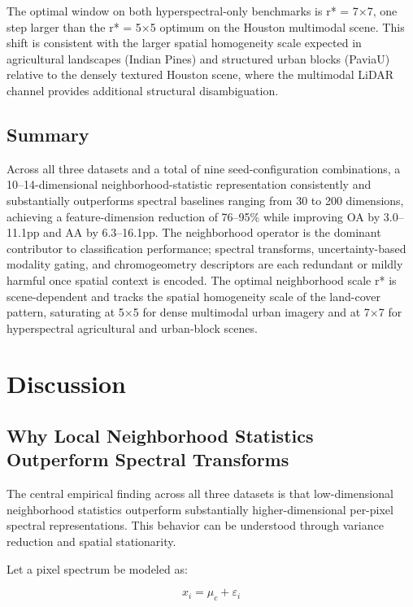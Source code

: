 \documentclass[
  journal]{IEEEtran}
\begin{document}
The optimal window on both hyperspectral-only benchmarks is r* = 7\(\times\)7,
one step larger than the r* = 5\(\times\)5 optimum on the Houston multimodal
scene. This shift is consistent with the larger spatial homogeneity
scale expected in agricultural landscapes (Indian Pines) and structured
urban blocks (PaviaU) relative to the densely textured Houston scene,
where the multimodal LiDAR channel provides additional structural
disambiguation.

\subsection{Summary}\label{summary}

Across all three datasets and a total of nine seed-configuration
combinations, a 10--14-dimensional neighborhood-statistic representation
consistently and substantially outperforms spectral baselines ranging
from 30 to 200 dimensions, achieving a feature-dimension reduction of
76--95\% while improving OA by 3.0--11.1pp and AA by 6.3--16.1pp. The
neighborhood operator is the dominant contributor to classification
performance; spectral transforms, uncertainty-based modality gating, and
chromogeometry descriptors are each redundant or mildly harmful once
spatial context is encoded. The optimal neighborhood scale r* is
scene-dependent and tracks the spatial homogeneity scale of the
land-cover pattern, saturating at 5\(\times\)5 for dense multimodal urban imagery
and at 7\(\times\)7 for hyperspectral agricultural and urban-block scenes.

\section{Discussion}\label{discussion}

\subsection{Why Local Neighborhood Statistics Outperform Spectral
Transforms}\label{why-local-neighborhood-statistics-outperform-spectral-transforms}

The central empirical finding across all three datasets is that
low-dimensional neighborhood statistics outperform substantially
higher-dimensional per-pixel spectral representations. This behavior can
be understood through variance reduction and spatial stationarity.

Let a pixel spectrum be modeled as:

\[x_i = \mu_c + \varepsilon_i\]
\end{document}
